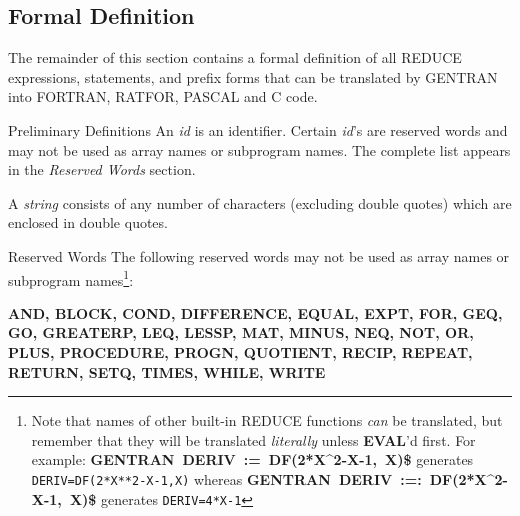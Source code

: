 \subsection{Formal Definition}
The remainder of this section contains a formal definition of all
REDUCE expressions, statements, and prefix forms that can be translated by
GENTRAN into FORTRAN, RATFOR, PASCAL and C code.

\begin{describe}{Preliminary Definitions}
An {\it id\/} is an identifier.  Certain {\it id\/}'s are reserved words
and may not be used as array names or subprogram names.  The
complete list appears in the {\it Reserved Words\/} section.

A {\it string\/} consists of any number of characters (excluding double
quotes) which are enclosed in double quotes.
\end{describe}

\begin{describe}{Reserved Words}
The following reserved words may not be used as array names or
subprogram names\footnote{Note that names of other built-in REDUCE functions
{\it can\/} be translated, but remember that they will be translated
{\it literally\/} unless {\bf EVAL}'d first.  For example:
{\bf GENTRAN~DERIV~:=~DF(2*X\^{}2-X-1,~X)\$}
generates {\tt DERIV=DF(2*X**2-X-1,X)}
whereas
{\bf GENTRAN~DERIV~:=:~DF(2*X\^{}2-X-1,~X)\$}
generates {\tt DERIV=4*X-1} }:

{\bf AND, BLOCK, COND, DIFFERENCE, EQUAL, EXPT, FOR, GEQ,
GO, GREATERP, LEQ, LESSP, MAT, MINUS, NEQ, NOT, OR,
PLUS, PROCEDURE, PROGN, QUOTIENT, RECIP, REPEAT,
RETURN, SETQ, TIMES, WHILE, WRITE}
\end{describe} 

